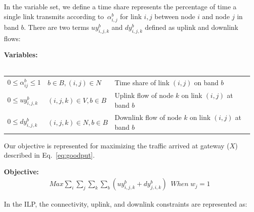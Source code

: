 In the variable set, we define a time share represents the percentage of time a single link transmits according 
to~$\alpha_{i,j}^b$ for link $i,j$ between node $i$ and node $j$ in band $b$. There are two terms $uy_{i,j,k}^{b}$
and $dy_{i,j,k}^{b}$ defined as uplink and downlink flows:

\noindent
{\bf Variables:}\\
\\
\begin{tabular}{llp{3cm}}
$0\le \alpha_{ij}^b \le 1$  & $b\in B, (i,j) \in N$ & 
Time share of link $(i,j)$ on band $b$\\ 
$0\le uy_{i,j,k}^b$ & $(i,j,k) \in V, b \in B$ & 
Uplink flow of node $k$ on link $(i,j)$ at band $b$ \\ 
$0\le dy_{i,j,k}^b$ & $(i,j,k) \in N, b \in B$ & 
Downlink flow of node $k$ on link $(i,j)$ at band $b$ \\ 
\end{tabular}
\vspace{1pt}

Our objective is represented for  
maximizing the traffic arrived at gateway ($X$)
described in Eq.~\ref{eq:goodput}.

\noindent
{\bf Objective:}
\begin{align}
& Max \sum_i\sum_j\sum_k\sum_b(uy_{i,j,k}^b+dy_{j,i,k}^b) \;\ When \; w_j=1 
\end{align}

In the ILP, the connectivity, uplink, and downlink constraints are represented as:  

